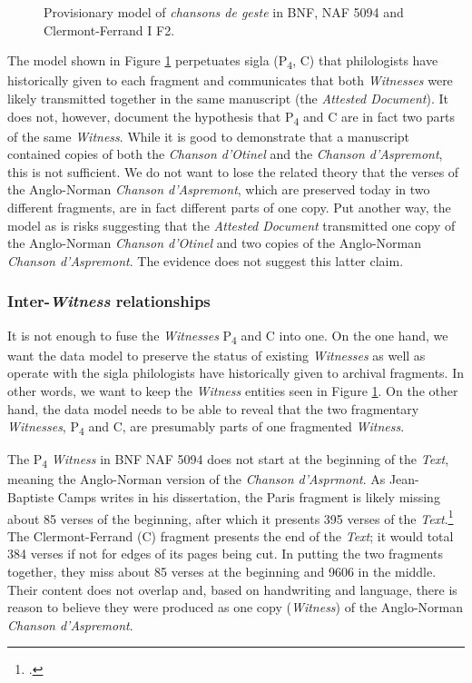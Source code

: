 \begin{figure}[ht]
    \begin{center}
        
    \end{center}
    \caption{Provisionary model of \textit{chansons de geste} in BNF, NAF 5094 and Clermont-Ferrand I F2.}
    \label{fig:AspremontCFBNF}
\end{figure}

The model shown in Figure \ref{fig:AspremontCFBNF} perpetuates sigla (P\textsubscript{4}, C) that philologists have historically given to each fragment and communicates that both \textit{Witnesses} were likely transmitted together in the same manuscript (the \textit{Attested Document}). It does not, however, document the hypothesis that P\textsubscript{4} and C are in fact two parts of the same \textit{Witness}. While it is good to demonstrate that a manuscript contained copies of both the \textit{Chanson d'Otinel} and the \textit{Chanson d'Aspremont}, this is not sufficient. We do not want to lose the related theory that the verses of the Anglo-Norman \textit{Chanson d'Aspremont}, which are preserved today in two different fragments, are in fact different parts of one copy. Put another way, the model as is risks suggesting that the \textit{Attested Document} transmitted one copy of the Anglo-Norman \textit{Chanson d'Otinel} and two copies of the Anglo-Norman \textit{Chanson d'Aspremont}. The evidence does not suggest this latter claim.

\subsubsection{Inter-\textit{Witness} relationships}

It is not enough to fuse the \textit{Witnesses} P\textsubscript{4} and C into one. On the one hand, we want the data model to preserve the status of existing \textit{Witnesses} as well as operate with the sigla philologists have historically given to archival fragments. In other words, we want to keep the \textit{Witness} entities seen in Figure \ref{fig:AspremontCFBNF}. On the other hand, the data model needs to be able to reveal that the two fragmentary \textit{Witnesses}, P\textsubscript{4} and C, are presumably parts of one fragmented \textit{Witness}.

The P\textsubscript{4} \textit{Witness} in BNF NAF 5094 does not start at the beginning of the \textit{Text}, meaning the Anglo-Norman version of the \textit{Chanson d'Asprmont}. As Jean-Baptiste Camps writes in his dissertation, the Paris fragment is likely missing about 85 verses of the beginning, after which it presents 395 verses of the \textit{Text}.\footcite[][xcvi]{camps2016} The Clermont-Ferrand (C) fragment presents the end of the \textit{Text}; it would total 384 verses if not for edges of its pages being cut. In putting the two fragments together, they miss about 85 verses at the beginning and 9606 in the middle. Their content does not overlap and, based on handwriting and language, there is reason to believe they were produced as one copy (\textit{Witness}) of the Anglo-Norman \textit{Chanson d'Aspremont}.

